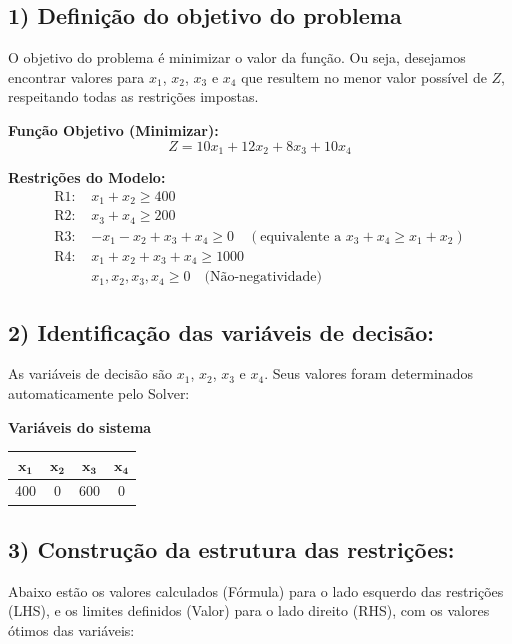 \documentclass[12pt, a4paper]{article}
\begin{document}
\subsection*{1) Definição do objetivo do problema}
O objetivo do problema é minimizar o valor da função. Ou seja, desejamos encontrar valores para $x_1$, $x_2$, $x_3$ e $x_4$ que resultem no menor valor possível de $Z$, respeitando todas as restrições impostas.

\textbf{Função Objetivo (Minimizar):}
$$Z = 10x_1 + 12x_2 + 8x_3 + 10x_4$$

\textbf{Restrições do Modelo:}
\begin{align*}
\text{R1: } & x_1 + x_2 \geq 400 \\
\text{R2: } & x_3 + x_4 \geq 200 \\
\text{R3: } & -x_1 - x_2 + x_3 + x_4 \geq 0 \quad (\text{equivalente a } x_3 + x_4 \geq x_1 + x_2) \\
\text{R4: } & x_1 + x_2 + x_3 + x_4 \geq 1000 \\
& x_1, x_2, x_3, x_4 \geq 0 \quad \text{(Não-negatividade)}
\end{align*}

\subsection*{2) Identificação das variáveis de decisão:}
As variáveis de decisão são $x_1$, $x_2$, $x_3$ e $x_4$. Seus valores foram determinados automaticamente pelo Solver:

\textbf{Variáveis do sistema}
\begin{center}
\begin{tabular}{|c|c|c|c|}
\hline
$\mathbf{x_1}$ & $\mathbf{x_2}$ & $\mathbf{x_3}$ & $\mathbf{x_4}$ \\
\hline
400 & 0 & 600 & 0 \\
\hline
\end{tabular}
\end{center}

\subsection*{3) Construção da estrutura das restrições:}
Abaixo estão os valores calculados (Fórmula) para o lado esquerdo das restrições (LHS), e os limites definidos (Valor) para o lado direito (RHS), com os valores ótimos das variáveis:
\end{document}

